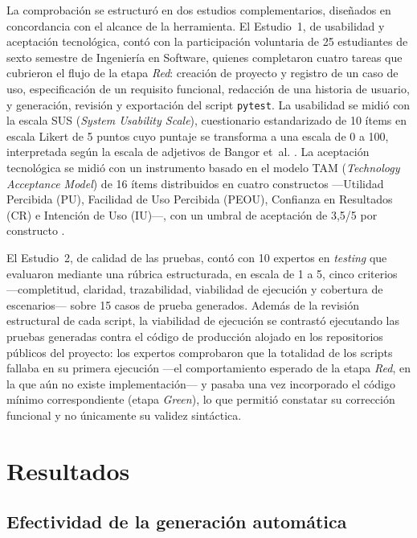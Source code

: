 \documentclass[10pt,journal,twoside,letterpaper]{IEEEtran}
\begin{document}
    La comprobación se estructuró en dos estudios complementarios, diseñados en concordancia con el alcance de la herramienta. El Estudio~1, de usabilidad y aceptación tecnológica, contó con la participación voluntaria de 25 estudiantes de sexto semestre de Ingeniería en Software, quienes completaron cuatro tareas que cubrieron el flujo de la etapa \emph{Red}: creación de proyecto y registro de un caso de uso, especificación de un requisito funcional, redacción de una historia de usuario, y generación, revisión y exportación del script \texttt{pytest}. La usabilidad se midió con la escala SUS (\emph{System Usability Scale}), cuestionario estandarizado de 10 ítems en escala Likert de 5 puntos cuyo puntaje se transforma a una escala de 0 a 100, interpretada según la escala de adjetivos de Bangor et~al. \cite{brooke1996sus,bangor2009sus}. La aceptación tecnológica se midió con un instrumento basado en el modelo TAM (\emph{Technology Acceptance Model}) de 16 ítems distribuidos en cuatro constructos ---Utilidad Percibida (PU), Facilidad de Uso Percibida (PEOU), Confianza en Resultados (CR) e Intención de Uso (IU)---, con un umbral de aceptación de 3,5/5 por constructo \cite{davis1989tam}.
    
    El Estudio~2, de calidad de las pruebas, contó con 10 expertos en \emph{testing} que evaluaron mediante una rúbrica estructurada, en escala de 1 a 5, cinco criterios ---completitud, claridad, trazabilidad, viabilidad de ejecución y cobertura de escenarios--- sobre 15 casos de prueba generados. Además de la revisión estructural de cada script, la viabilidad de ejecución se contrastó ejecutando las pruebas generadas contra el código de producción alojado en los repositorios públicos del proyecto: los expertos comprobaron que la totalidad de los scripts fallaba en su primera ejecución ---el comportamiento esperado de la etapa \emph{Red}, en la que aún no existe implementación--- y pasaba una vez incorporado el código mínimo correspondiente (etapa \emph{Green}), lo que permitió constatar su corrección funcional y no únicamente su validez sintáctica.
    
    \section{Resultados}
    \label{sec:resultados}
    
    \subsection{Efectividad de la generación automática}
    \label{subsec:generacion}
    
\end{document}
